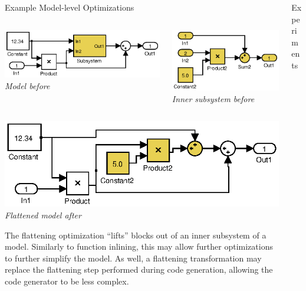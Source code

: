 \documentclass[final,hyperref={pdfpagelabels=false}]{beamer}
\begin{document}
\begin{frame}{}
\begin{columns}[t,totalwidth=\linewidth]
\begin{column}{.585\linewidth}
\begin{block}{Example Model-level Optimizations}
\begin{columns}[c,totalwidth=\linewidth]
\begin{column}{.485\linewidth}
\begin{center}
         \includegraphics[width=0.8\linewidth]{images/models/Flatten1}\\
         \footnotesize \textit{Model before}
         \end{center}
         \end{column}
         \begin{column}{.485\linewidth}
         \begin{center}
         \includegraphics[width=0.6\linewidth]{images/models/Flatten1_subsystem}\\
         \footnotesize \textit{Inner subsystem before}
         \end{center}
         \end{column}
         \end{columns}
         \begin{center}
          \includegraphics[width=0.5\linewidth]{images/models/Flatten1_export}\\
          \footnotesize \textit{Flattened model after}
          \end{center}
         \footnotesize
         The flattening optimization ``lifts'' blocks out of an inner subsystem of a model. Similarly to function inlining, this may allow further optimizations to further simplify the model. As well, a flattening transformation may replace the flattening step performed during code generation, allowing the code generator to be less complex.
         
        \end{block}
      \end{column}
\vspace{0.1cm}
     \begin{column}{.4\linewidth}
             \begin{block}{Experiments}


\end{block}
\end{column}
\end{columns}
\end{frame}
\end{document}
